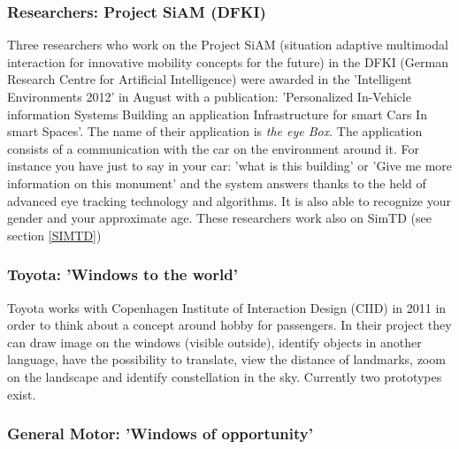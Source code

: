\documentclass[a4paper]{article}
\begin{document}
\subsubsection{Researchers: Project SiAM (DFKI)}

Three researchers \cite{DFKI} who work on the Project SiAM (situation adaptive multimodal interaction for innovative mobility concepts for the future) in the DFKI (German Research Centre for Artificial Intelligence) were awarded in the 'Intelligent Environments 2012' in August with a publication: 'Personalized In-Vehicle information Systems Building an application Infrastructure for smart Cars In smart Spaces'. The name of their application is \textit{the eye Box}. The application consists of a communication with the car on the environment around it. For instance you have just to say in your car: 'what is this building' or 'Give me more information on this monument' and the system answers thanks to the held of advanced eye tracking technology and algorithms. It is also able to recognize your gender and your approximate age. These researchers work also on SimTD (see section \ref{SIMTD})


\subsubsection{Toyota: 'Windows to the world'}

Toyota \cite{ToyotaWindows} works with Copenhagen Institute of Interaction Design (CIID) in 2011 in order to think about a concept around hobby for passengers. In their project they can draw image on the windows (visible outside), identify objects in another language, have the possibility to translate, view the distance of landmarks, zoom on the landscape and identify constellation in the sky. Currently two prototypes exist.

\subsubsection{General Motor: 'Windows of opportunity'}
\end{document}
